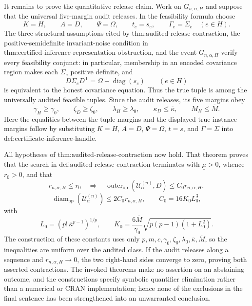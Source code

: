 It remains to prove the quantitative release claim.  Work on \(G_{n,\alpha,H}\) and suppose that the universal five-margin audit releases.  In the feasibility formula choose
\[
K=H,
\qquad A=D,
\qquad \Psi=\Omega,
\qquad t_e=s_e,
\qquad \Gamma_e=\Sigma_e\quad(e\in H).
\]
The three structural assumptions cited by \(\text{thm:audited-release-contraction}\), the positive-semidefinite invariant-noise condition in \(\text{thm:certified-inference-representation-obstruction}\), and the event \(G_{n,\alpha,H}\) verify every feasibility conjunct: in particular, membership in an encoded covariance region makes each \(\Sigma_e\) positive definite, and
\[
D\Sigma_eD^{\mathsf T}=\Omega+\operatorname{diag}(s_e)
\qquad(e\in H)
\]
is equivalent to the honest covariance equation.  Thus the true tuple is among the universally audited feasible tuples.  Since the audit releases, its five margins obey
\[
\gamma_H\geq\gamma_0,
\qquad
\zeta_D\geq\zeta_0,
\qquad
\lambda_H\geq\lambda_0,
\qquad
\kappa_D\leq\overline\kappa,
\qquad
M_H\leq\overline M.
\]
Here the equalities between the tuple margins and the displayed true-instance margins follow by substituting \(K=H\), \(A=D\), \(\Psi=\Omega\), \(t=s\), and \(\Gamma=\Sigma\) into \(\text{def:certificate-inference-handle}\).

All hypotheses of \(\text{thm:audited-release-contraction}\) now hold.  That theorem proves that the search in \(\text{def:audited-release-contraction}\) terminates with \(\underline\mu>0\), whence \(r_0>0\), and that
\[
r_{n,\alpha,H}\leq r_0
\quad\Longrightarrow\quad
\operatorname{outer}_{\mathrm{op}}(\mathcal U^{(n)}_\alpha,D)
\leq C_0r_{n,\alpha,H},
\]
\[
\operatorname{diam}_{\mathrm{op}}(\mathcal U^{(n)}_\alpha)
\leq2C_0r_{n,\alpha,H},
\qquad
C_0=16K_0L_0^3,
\]
with
\[
L_0=(p!\,\overline\kappa^{p-1})^{1/p},
\qquad
K_0=\frac{6\overline M}{\gamma_0}
\sqrt{p(p-1)(1+L_0^2)}.
\]
The construction of these constants uses only \(p,m,c,\gamma_0,\zeta_0,\lambda_0,\overline\kappa,\overline M\), so the inequalities are uniform over the audited class.  If the audit releases along a sequence and \(r_{n,\alpha,H}\to0\), the two right-hand sides converge to zero, proving both asserted contractions.  The invoked theorems make no assertion on an abstaining outcome, and the constructions specify symbolic quantifier elimination rather than a numerical or CRAN implementation; hence none of the exclusions in the final sentence has been strengthened into an unwarranted conclusion.